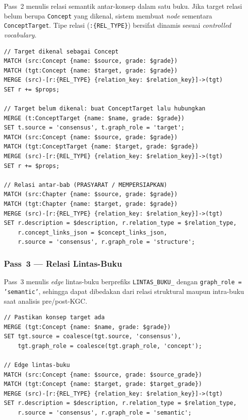 \documentclass[../../thesis]{subfiles}
\begin{document}
Pass~2 menulis relasi semantik antar-konsep dalam satu buku. Jika target
relasi belum berupa \texttt{Concept} yang dikenal, sistem membuat
\textit{node} sementara \texttt{ConceptTarget}. Tipe relasi
(\texttt{:\{REL\_TYPE\}}) bersifat dinamis sesuai \textit{controlled vocabulary}.

\begin{lstlisting}[style=cypherbox,caption={Relasi intra-buku konsep-ke-konsep dan konsep-ke-target (Pass~2).},label={lst:cypher-pass2}]
// Target dikenal sebagai Concept
MATCH (src:Concept {name: $source, grade: $grade})
MATCH (tgt:Concept {name: $target, grade: $grade})
MERGE (src)-[r:{REL_TYPE} {relation_key: $relation_key}]->(tgt)
SET r += $props;

// Target belum dikenal: buat ConceptTarget lalu hubungkan
MERGE (t:ConceptTarget {name: $name, grade: $grade})
SET t.source = 'consensus', t.graph_role = 'target';
MATCH (src:Concept {name: $source, grade: $grade})
MATCH (tgt:ConceptTarget {name: $target, grade: $grade})
MERGE (src)-[r:{REL_TYPE} {relation_key: $relation_key}]->(tgt)
SET r += $props;

// Relasi antar-bab (PRASYARAT / MEMPERSIAPKAN)
MATCH (src:Chapter {name: $source, grade: $grade})
MATCH (tgt:Chapter {name: $target, grade: $grade})
MERGE (src)-[r:{REL_TYPE} {relation_key: $relation_key}]->(tgt)
SET r.description = $description, r.relation_type = $relation_type,
    r.concept_links_json = $concept_links_json,
    r.source = 'consensus', r.graph_role = 'structure';
\end{lstlisting}

\subsubsection{Pass~3 --- Relasi Lintas-Buku}

Pass~3 menulis \textit{edge} lintas-buku berprefiks \texttt{LINTAS\_BUKU\_}
dengan \texttt{graph\_role = 'semantic'}, sehingga dapat dibedakan dari relasi
struktural maupun intra-buku saat analisis pre/post-KGC.

\begin{lstlisting}[style=cypherbox,caption={Penulisan edge lintas-buku (Pass~3).},label={lst:cypher-pass3}]
// Pastikan konsep target ada
MERGE (tgt:Concept {name: $name, grade: $grade})
SET tgt.source = coalesce(tgt.source, 'consensus'),
    tgt.graph_role = coalesce(tgt.graph_role, 'concept');

// Edge lintas-buku
MATCH (src:Concept {name: $source, grade: $source_grade})
MATCH (tgt:Concept {name: $target, grade: $target_grade})
MERGE (src)-[r:{REL_TYPE} {relation_key: $relation_key}]->(tgt)
SET r.description = $description, r.relation_type = $relation_type,
    r.source = 'consensus', r.graph_role = 'semantic';
\end{lstlisting}
\end{document}
